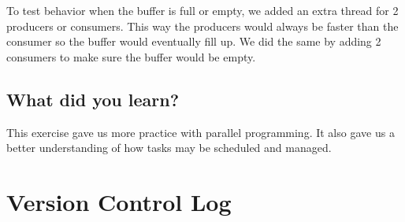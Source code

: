 \documentclass[onecolumn, draftclsnofoot,10pt, compsoc]{IEEEtran}
\begin{document}
To test behavior when the buffer is full or empty, we added an extra thread for 2 producers or consumers. This way the producers would always be faster than the consumer so the buffer would eventually fill up. We did the same by adding 2 consumers to make sure the buffer would be empty. 


\subsection{What did you learn?}
This exercise gave us more practice with parallel programming. It also gave us a better understanding of how tasks may be scheduled and managed. 

\section{Version Control Log}
\end{document}
